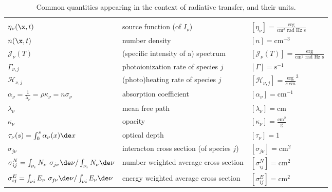 \begin{table}
\begin{center}
\begin{small}
\begin{tabular}{p{} p{} p{}}
         
\\
\hline\\


$\eta_\nu(\x, t)$ &
        source function (of $I_\nu$)&
        $[ \eta_\nu ] = \frac{\text{erg}}{\text{cm}^3 \text{ rad Hz s}}$ 
\\[.5em]
$n(\x, t)$ &
        number density &
        $[ n ] = \text{cm}^{-3}$
\\[.5em]
$\mathcal{J}_\nu(T)$ &
        (specific intensity of a) spectrum &
        $[\mathcal{J}_\nu (T)] = \frac{\text{erg}}{\text{cm}^2 \text{ rad Hz s}}$ 
\\[.5em]
$\Gamma_{\nu, j}$ &
        photoionization rate of species $j$ &
        $[\Gamma] = \text{s}^{-1}$
\\[.5em]
$\mathcal{H}_{\nu,j}$ &
        (photo)heating rate of species $j$ &
        $[\mathcal{H}_{\nu,j}] = \frac{\text{erg}}{s\ cm}^{3}$
\\[.5em]
$\alpha_\nu = \frac{1}{\lambda_\nu} = \rho \kappa_\nu = n \sigma_\nu$ &
        absorption coefficient &
        $[\alpha_\nu] = \text{cm}^{-1}$
\\[.5em]
$\lambda_\nu $ &
        mean free path &
        $[\lambda_\nu] = \text{cm}$
\\[.5em]
$\kappa_\nu $ &
        opacity &
        $[\kappa_\nu] = \frac{\text{cm}^2}{\text{g}}$
\\[.5em]
$\tau_\nu(s) = \int_0^s \alpha_\nu(x) \de x$ &
        optical depth &
        $[\tau_\nu] = 1$
\\[.5em]
$\sigma_{j\nu}$ &
        interacton cross section (of species $j$)&
        $[\sigma_{j\nu}] = \text{cm}^2$
\\[.5em]
$\sigma_{ij}^N = \int_{\nu_{i}} N_\nu \ \sigma_{j\nu} \de \nu / \int_{\nu_i} N_\nu \de \nu$ &
        number weighted average cross section &
        $[\sigma_{ij}^N] = \text{cm}^2$
\\[.5em]
$\sigma_{ij}^E = \int_{\nu i} E_\nu \ \sigma_{j\nu} \de \nu / \int_{\nu i} E_\nu \de \nu$ &
        energy weighted average cross section &
        $[\sigma_{ij}^E] = \text{cm}^2$
%

\end{tabular}
\end{small}
\end{center}
\caption{Common quantities appearing in the context of radiative transfer, and their units.}
\label{tab:rt-variables}
\end{table}

